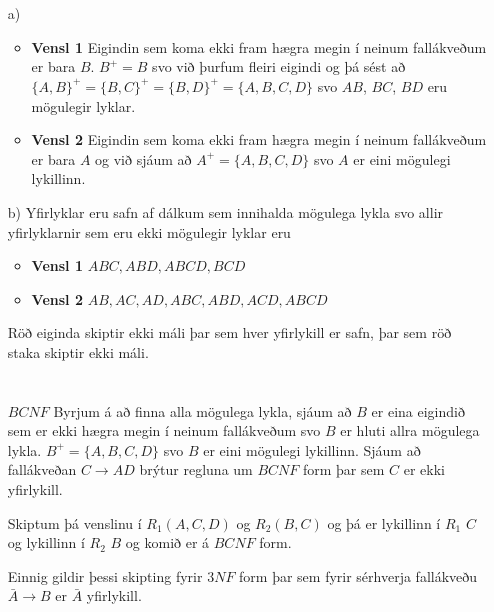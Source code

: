 \documentclass{article}
\begin{document}
	\section{}
	\begin{itemize}
		\item[a)]
			\begin{itemize}
				\item \textbf{Vensl 1} Eigindin sem koma ekki fram hægra 
					megin í neinum fallákveðum er bara $B$. $B^+ = {B}$ svo 
					við þurfum fleiri eigindi og þá sést að $\{A,B\}^+ = 
					\{B,C\}^+ = \{B,D\}^+ = \{A,B,C,D\}$ svo $AB$, $BC$, 
					$BD$ eru mögulegir lyklar.
				\item \textbf{Vensl 2} Eigindin sem koma ekki fram hægra 
					megin í neinum fallákveðum er bara $A$ og við sjáum að 
					$A^+ = \{A,B,C,D\}$ svo $A$ er eini mögulegi lykillinn.
			\end{itemize}
		\item[b)] Yfirlyklar eru safn af dálkum sem innihalda mögulega 
			lykla svo allir yfirlyklarnir sem eru ekki mögulegir lyklar eru
			\begin{itemize} 
			\item \textbf{Vensl 1} $ABC, ABD, ABCD, BCD$
				\item \textbf{Vensl 2} $AB, AC, AD, ABC, ABD, ACD, ABCD$
			\end{itemize}
			Röð eiginda skiptir ekki máli þar sem hver yfirlykill er safn, 
			þar sem röð staka skiptir ekki máli.
	\end{itemize}

	\section{}
	\begin{itemize}
		\item[$BCNF$] Byrjum á að finna alla mögulega lykla, sjáum að $B$ er 
			eina eigindið sem er ekki hægra megin í neinum fallákveðum svo 
			$B$ er hluti allra mögulega lykla. $B^+ = \{A,B,C,D\}$ svo $B$ 
			er eini mögulegi lykillinn. Sjáum að fallákveðan $C \rightarrow 
			AD$ brýtur regluna um $BCNF$ form þar sem $C$ er ekki yfirlykill.

			Skiptum þá venslinu í $R_1(A,C,D)$ og $R_2(B,C)$ og þá er 
			lykillinn í $R_1$ $C$ og lykillinn í $R_2$ $B$ og komið er á 
			$BCNF$ form.

			Einnig gildir þessi skipting fyrir $3NF$ form þar sem fyrir 
			sérhverja fallákveðu $\bar{A} \rightarrow B$ er $\bar{A}$ 
			yfirlykill.
	\end{itemize}
\end{document}

